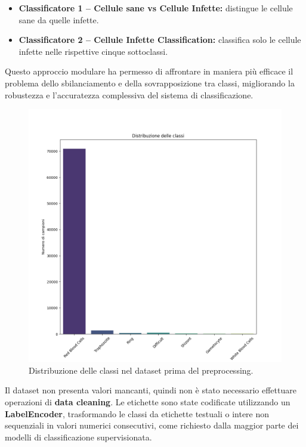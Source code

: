 \documentclass[minted, draw]{../tex/hebdomon}
\begin{document}
\begin{itemize}
	\item  \textbf{Classificatore 1 – Cellule sane vs Cellule Infette:} distingue le cellule sane da quelle infette.
	\item \textbf{Classificatore 2 – Cellule Infette Classification:} classifica solo le cellule infette nelle rispettive cinque sottoclassi.
\end{itemize}


Questo approccio modulare ha permesso di affrontare in maniera più efficace il problema dello sbilanciamento e della sovrapposizione tra classi, migliorando la robustezza e l’accuratezza complessiva del sistema di classificazione.


% 
\begin{figure}[H]
  \centering
  \includegraphics[width=.7\linewidth]{figures/class_distribution.png}
  \caption{Distribuzione delle classi nel dataset prima del preprocessing.}
  \label{fig:sbilanciamento}
\end{figure}
%

Il dataset non presenta valori mancanti, quindi non è stato necessario effettuare operazioni di \textbf{data cleaning}. Le etichette sono state codificate utilizzando un \textbf{LabelEncoder}, trasformando le classi da etichette testuali o intere non sequenziali in valori numerici consecutivi, come richiesto dalla maggior parte dei modelli di classificazione supervisionata.
\end{document}
